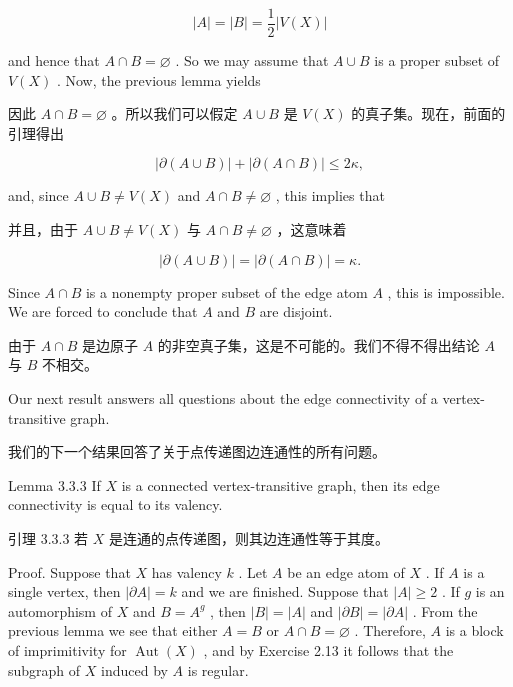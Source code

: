 \documentclass[10pt]{article}
\begin{document}
\[
\left| A\right|  = \left| B\right|  = \frac{1}{2}\left| {V\left( X\right) }\right|
\]

and hence that \(A \cap  B = \varnothing\) . So we may assume that \(A \cup  B\) is a proper subset of \(V\left( X\right)\) . Now, the previous lemma yields

\begin{tcolorbox}\relax
因此 \(A \cap  B = \varnothing\) 。所以我们可以假定 \(A \cup  B\) 是 \(V\left( X\right)\) 的真子集。现在，前面的引理得出
\end{tcolorbox}

\[
\left| {\partial \left( {A \cup  B}\right) }\right|  + \left| {\partial \left( {A \cap  B}\right) }\right|  \leq  {2\kappa },
\]

and, since \(A \cup  B \neq  V\left( X\right)\) and \(A \cap  B \neq  \varnothing\) , this implies that

\begin{tcolorbox}\relax
并且，由于 \(A \cup  B \neq  V\left( X\right)\) 与 \(A \cap  B \neq  \varnothing\) ，这意味着
\end{tcolorbox}

\[
\left| {\partial \left( {A \cup  B}\right) }\right|  = \left| {\partial \left( {A \cap  B}\right) }\right|  = \kappa .
\]

Since \(A \cap  B\) is a nonempty proper subset of the edge atom \(A\) , this is impossible. We are forced to conclude that \(A\) and \(B\) are disjoint.

\begin{tcolorbox}\relax
由于 \(A \cap  B\) 是边原子 \(A\) 的非空真子集，这是不可能的。我们不得不得出结论 \(A\) 与 \(B\) 不相交。
\end{tcolorbox}

Our next result answers all questions about the edge connectivity of a vertex-transitive graph.

\begin{tcolorbox}\relax
我们的下一个结果回答了关于点传递图边连通性的所有问题。
\end{tcolorbox}

Lemma 3.3.3 If \(X\) is a connected vertex-transitive graph, then its edge connectivity is equal to its valency.

\begin{tcolorbox}\relax
引理 3.3.3 若 \(X\) 是连通的点传递图，则其边连通性等于其度。
\end{tcolorbox}

Proof. Suppose that \(X\) has valency \(k\) . Let \(A\) be an edge atom of \(X\) . If \(A\) is a single vertex, then \(\left| {\partial A}\right|  = k\) and we are finished. Suppose that \(\left| A\right|  \geq  2\) . If \(g\) is an automorphism of \(X\) and \(B = {A}^{g}\) , then \(\left| B\right|  = \left| A\right|\) and \(\left| {\partial B}\right|  = \left| {\partial A}\right|\) . From the previous lemma we see that either \(A = B\) or \(A \cap  B = \varnothing\) . Therefore, \(A\) is a block of imprimitivity for \(\operatorname{Aut}\left( X\right)\) , and by Exercise 2.13 it follows that the subgraph of \(X\) induced by \(A\) is regular.
\end{document}
